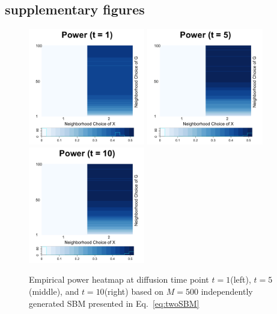 \documentclass[12pt]{article}
\theoremstyle{definition}
\begin{document}
\subsection{supplementary figures}

\begin{figure}[H]
	\centering
	\includegraphics[width=2in]{../Figure/twoSBM_power1.png}
	\includegraphics[width=2in]{../Figure/twoSBM_power5.png}
	\includegraphics[width=2in]{../Figure/twoSBM_power10.png}
	\caption{Empirical power heatmap at diffusion time point $t=1$(left), $t=5$(middle), and $t=10$(right) based on $M = 500$ independently generated SBM presented in Eq.~\ref{eq:twoSBM}}
	\label{fig:twoSBM_power}
\end{figure}
\end{document}
